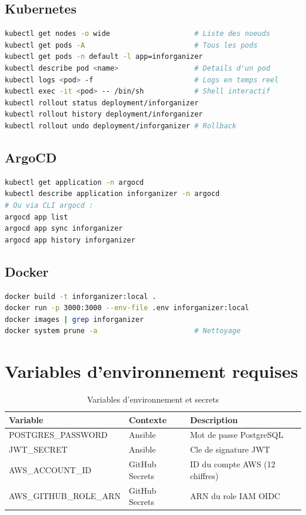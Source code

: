 \documentclass[12pt,a4paper,french]{report}
\begin{document}
\subsection{Kubernetes}
\begin{lstlisting}[language=bash]
kubectl get nodes -o wide                    # Liste des noeuds
kubectl get pods -A                          # Tous les pods
kubectl get pods -n default -l app=inforganizer
kubectl describe pod <name>                  # Details d'un pod
kubectl logs <pod> -f                        # Logs en temps reel
kubectl exec -it <pod> -- /bin/sh            # Shell interactif
kubectl rollout status deployment/inforganizer
kubectl rollout history deployment/inforganizer
kubectl rollout undo deployment/inforganizer # Rollback
\end{lstlisting}

\subsection{ArgoCD}
\begin{lstlisting}[language=bash]
kubectl get application -n argocd
kubectl describe application inforganizer -n argocd
# Ou via CLI argocd :
argocd app list
argocd app sync inforganizer
argocd app history inforganizer
\end{lstlisting}

\subsection{Docker}
\begin{lstlisting}[language=bash]
docker build -t inforganizer:local .
docker run -p 3000:3000 --env-file .env inforganizer:local
docker images | grep inforganizer
docker system prune -a                       # Nettoyage
\end{lstlisting}

\section{Variables d'environnement requises}

\begin{table}[H]
    \centering
    \begin{tabular}{|l|l|l|}
        \hline
        \textbf{Variable} & \textbf{Contexte} & \textbf{Description} \\
        \hline
        POSTGRES\_PASSWORD & Ansible & Mot de passe PostgreSQL \\
        JWT\_SECRET & Ansible & Cle de signature JWT \\
        AWS\_ACCOUNT\_ID & GitHub Secrets & ID du compte AWS (12 chiffres) \\
        AWS\_GITHUB\_ROLE\_ARN & GitHub Secrets & ARN du role IAM OIDC \\
        \hline
    \end{tabular}
    \caption{Variables d'environnement et secrets}
    \label{table:env-vars}
\end{table}
\end{document}
